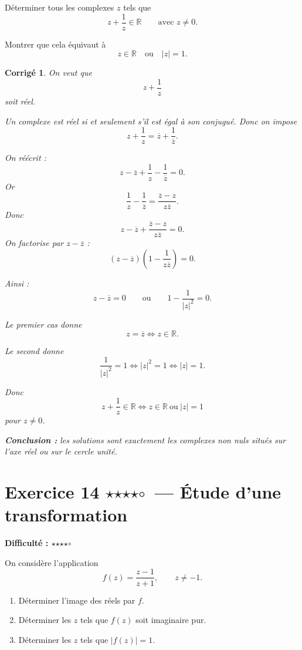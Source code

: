 \documentclass[11pt,a4paper]{article}
\newtheorem*{corrige}{Corrigé}
\newcommand{\R}{\mathbb{R}}
\newcommand{\fullstar}{\(\star\)}
\newcommand{\emptystar}{\(\circ\)}
\newcommand{\fourStars}{\fullstar\fullstar\fullstar\fullstar\emptystar}
\newcommand{\difficulty}[1]{\textbf{Difficulté : #1}}
\begin{document}
Déterminer tous les complexes \(z\) tels que
\[
z+\frac1z\in\R
\qquad \text{avec } z\neq 0.
\]

Montrer que cela équivaut à
\[
z\in\R \quad \text{ou} \quad |z|=1.
\]

\begin{corrige}
On veut que
\[
z+\frac1z
\]
soit réel.

Un complexe est réel si et seulement s'il est égal à son conjugué. Donc on impose
\[
z+\frac1z=\overline z+\frac1{\overline z}.
\]

On réécrit :
\[
z-\overline z+\frac1z-\frac1{\overline z}=0.
\]
Or
\[
\frac1z-\frac1{\overline z}=\frac{\overline z-z}{z\overline z}.
\]
Donc
\[
z-\overline z+\frac{\overline z-z}{z\overline z}=0.
\]
On factorise par \(z-\overline z\) :
\[
(z-\overline z)\left(1-\frac1{z\overline z}\right)=0.
\]

Ainsi :
\[
z-\overline z=0
\qquad \text{ou} \qquad
1-\frac1{|z|^2}=0.
\]

Le premier cas donne
\[
z=\overline z \iff z\in\R.
\]

Le second donne
\[
\frac1{|z|^2}=1 \iff |z|^2=1 \iff |z|=1.
\]

Donc
\[
\boxed{z+\frac1z\in\R \iff z\in\R \ \text{ou}\ |z|=1}
\]
pour \(z\neq 0\).

\textbf{Conclusion :}
les solutions sont exactement les complexes non nuls situés sur l'axe réel ou sur le cercle unité.
\end{corrige}

\section{Exercice 14 \fourStars\ --- Étude d'une transformation}
\difficulty{\fourStars}

On considère l'application
\[
f(z)=\frac{z-1}{z+1},
\qquad z\neq -1.
\]

\begin{enumerate}
    \item Déterminer l'image des réels par \(f\).
    \item Déterminer les \(z\) tels que \(f(z)\) soit imaginaire pur.
    \item Déterminer les \(z\) tels que \(|f(z)|=1\).
\end{enumerate}
\end{document}
